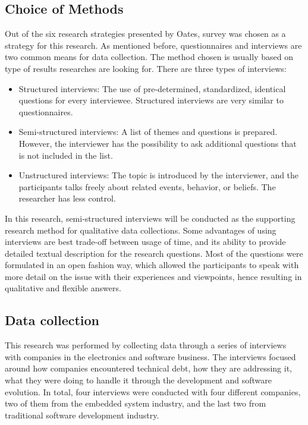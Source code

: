 \subsection{Choice of Methods}
Out of the six research strategies presented by Oates\cite{Oates:2006:RIS:1202299}, survey was chosen as a strategy for this research. As mentioned before, questionnaires and interviews are two common means for data collection\cite{Wohlin:2000:ESE:330775}. The method chosen is usually based on type of results researches are looking for. There are three types of interviews\cite{Oates:2006:RIS:1202299}:
\begin{itemize}
	\item Structured interviews: The use of pre-determined, standardized, identical questions for every interviewee. Structured interviews are very similar to questionnaires.
	\item Semi-structured interviews: A list of themes and questions is prepared. However, the interviewer has the possibility to ask additional questions that is not included in the list.
	\item Unstructured interviews: The topic is introduced by the interviewer, and the participants talks freely about related events, behavior, or beliefs. The researcher has less control. 
\end{itemize}

In this research, semi-structured interviews will be conducted as the supporting research method for qualitative data collections. Some advantages of using interviews are best trade-off between usage of time, and its ability to provide detailed textual description for the research questions. Most of the questions were formulated in an open fashion way, which allowed the participants to speak with more detail on the issue with their experiences and viewpoints\cite{Oates:2006:RIS:1202299,Wohlin:2000:ESE:330775}, hence resulting in qualitative and flexible answers. 

\subsection{Data collection}
This research was performed by collecting data through a series of interviews with companies in the electronics and software business. The interviews focused around how companies encountered technical debt, how they are addressing it, what they were doing to handle it through the development and software evolution. In total, four interviews were conducted with four different companies, two of them from the embedded system industry, and the last two from traditional software development industry.

